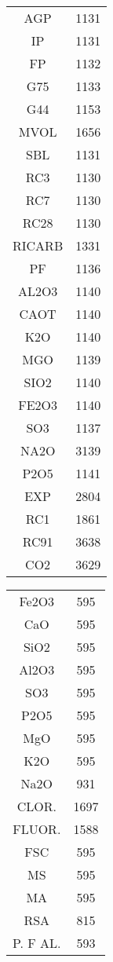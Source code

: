 \begin{center}
\begin{tabular}{ c c }
AGP     &  1131\\
IP      &  1131\\
FP      &  1132\\
G75    &  1133\\
G44   &  1153\\
MVOL    &  1656\\
SBL     &  1131\\
RC3     &  1130\\
RC7     &  1130\\
RC28    &  1130\\
RICARB  &  1331\\
PF      &  1136\\
AL2O3   &  1140\\
CAOT    &  1140\\
K2O     &  1140\\
MGO     &  1139\\
SIO2    &  1140\\
FE2O3   &  1140\\
SO3     &  1137\\
NA2O    &  3139\\
P2O5    &  1141\\
EXP     &  2804\\
RC1     &  1861\\
RC91    &  3638\\
CO2     &  3629 
\end{tabular}
\end{center}

\newpage

\begin{center}
\begin{tabular}{ c c }
Fe2O3     &   595\\
CaO       &  595\\
SiO2      &   595\\
Al2O3     &   595\\
SO3       &   595\\
P2O5      &   595\\
MgO       &   595\\
K2O       &   595\\
Na2O      &   931\\
CLOR.     &  1697\\
FLUOR.    &  1588\\
FSC       &   595\\
MS        &   595\\
MA        &   595\\
RSA       &   815\\
P. F AL.  &   593 \\
\end{tabular}
\end{center}

